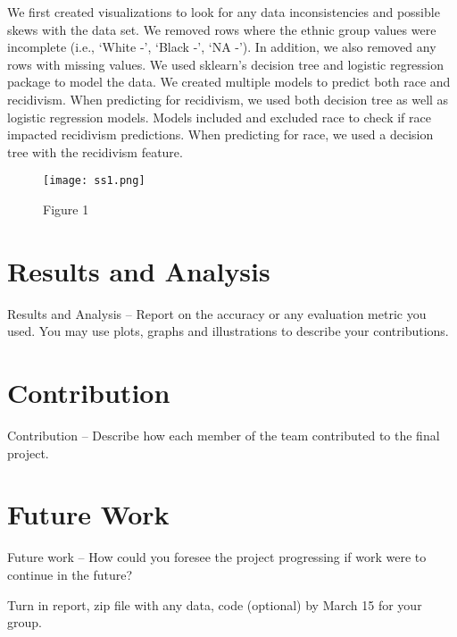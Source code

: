 \documentclass[10.5pt, sigconf]{acmart}
\begin{document}
We first created visualizations to look for any data inconsistencies and possible skews with the data set. We removed rows where the ethnic group values were incomplete (i.e., ‘White -’, ‘Black -’, ‘NA -’). In addition, we also removed any rows with missing values. We used sklearn’s decision tree and logistic regression package to model the data. We created multiple models to predict both race and recidivism. When predicting for recidivism, we used both decision tree as well as logistic regression models. Models included and excluded race to check if race impacted recidivism predictions. When predicting for race, we used a decision tree with the recidivism feature.

\begin{figure}[h] 	
\centering
\texttt{[image: ss1.png]}
\caption{Figure 1}
\end{figure}

\section{Results and Analysis}
Results and Analysis – Report on the accuracy or any evaluation metric you used. You may use
plots, graphs and
illustrations to describe your contributions.

\section{Contribution}
Contribution – Describe how each member of the team contributed to the final project.


\section{Future Work}
Future work – How could you foresee the project progressing if work were to continue in the
future?


Turn in report, zip file with any data, code (optional) by March 15 for your group.
\end{document}
